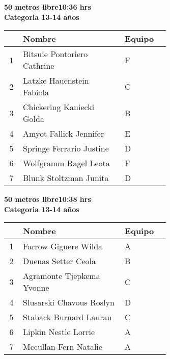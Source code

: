 \begin{minipage}{0.95\linewidth}\vspace{0.5cm} 
\begin{flushleft}
\textbf{
\hspace{-0.15cm}50 metros libre\hspace{1.5cm}10:36 hrs \\Categoria 13-14 años}\vspace{-0.2cm} 
\end{flushleft}
\begin{tabular}{cp{0.63\linewidth}l}
\hline
& \textbf{Nombre} & \textbf{Equipo} \\ \hline
1 & Bitsuie Pontoriero Cathrine & F \\ 
2 & Latzke Hauenstein Fabiola & C \\ 
3 & Chickering Kaniecki Golda & B \\ 
4 & Amyot Fallick Jennifer & E \\ 
5 & Springe Ferrario Justine & D \\ 
6 & Wolfgramm Ragel Leota & F \\ 
7 & Blunk Stoltzman Junita & D \\ 
\end{tabular}
\end{minipage}
\begin{minipage}{0.95\linewidth}\vspace{0.5cm} 
\begin{flushleft}
\textbf{
\hspace{-0.15cm}50 metros libre\hspace{1.5cm}10:38 hrs \\Categoria 13-14 años}\vspace{-0.2cm} 
\end{flushleft}
\begin{tabular}{cp{0.63\linewidth}l}
\hline
& \textbf{Nombre} & \textbf{Equipo} \\ \hline
1 & Farrow Giguere Wilda & A \\ 
2 & Duenas Setter Ceola & B \\ 
3 & Agramonte Tjepkema Yvonne & C \\ 
4 & Slusarski Chavous Roslyn & D \\ 
5 & Staback Burnard Lauran & C \\ 
6 & Lipkin Nestle Lorrie & A \\ 
7 & Mccullan Fern Natalie & A \\ 
\end{tabular}
\end{minipage}
